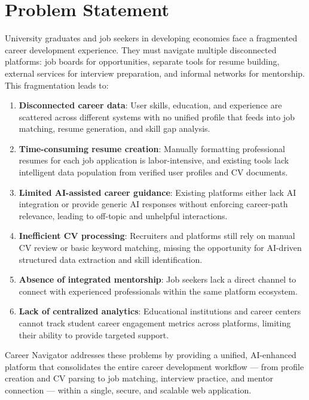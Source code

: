 \documentclass[12pt,a4paper]{report}
\begin{document}
\section{Problem Statement}
University graduates and job seekers in developing economies face a fragmented career development experience. They must navigate multiple disconnected platforms: job boards for opportunities, separate tools for resume building, external services for interview preparation, and informal networks for mentorship. This fragmentation leads to:

\begin{enumerate}[label=\textbf{P-\arabic*}:, leftmargin=*]
    \item \textbf{Disconnected career data}: User skills, education, and experience are scattered across different systems with no unified profile that feeds into job matching, resume generation, and skill gap analysis.
    \item \textbf{Time-consuming resume creation}: Manually formatting professional resumes for each job application is labor-intensive, and existing tools lack intelligent data population from verified user profiles and CV documents.
    \item \textbf{Limited AI-assisted career guidance}: Existing platforms either lack AI integration or provide generic AI responses without enforcing career-path relevance, leading to off-topic and unhelpful interactions.
    \item \textbf{Inefficient CV processing}: Recruiters and platforms still rely on manual CV review or basic keyword matching, missing the opportunity for AI-driven structured data extraction and skill identification.
    \item \textbf{Absence of integrated mentorship}: Job seekers lack a direct channel to connect with experienced professionals within the same platform ecosystem.
    \item \textbf{Lack of centralized analytics}: Educational institutions and career centers cannot track student career engagement metrics across platforms, limiting their ability to provide targeted support.
\end{enumerate}

Career Navigator addresses these problems by providing a unified, AI-enhanced platform that consolidates the entire career development workflow — from profile creation and CV parsing to job matching, interview practice, and mentor connection — within a single, secure, and scalable web application.
\end{document}
